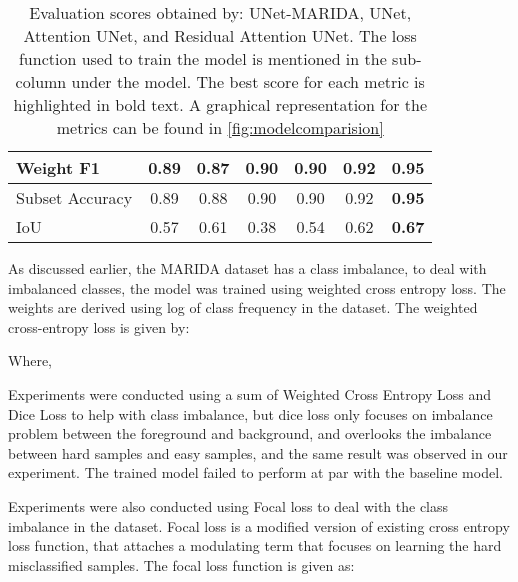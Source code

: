 \documentclass[review]{elsarticle}
\begin{document}
\begin{table}[]
{\begin{tabular}{|l|c|ccc|c|c|}
Weight F1 & 0.89 & \multicolumn{1}{c|}{0.87} & \multicolumn{1}{c|}{0.90} & 0.90 & 0.92 & \textbf{0.95} \\ \hline
Subset Accuracy & 0.89 & \multicolumn{1}{c|}{0.88} & \multicolumn{1}{c|}{0.90} & 0.90 & 0.92 & \textbf{0.95} \\ \hline
IoU & 0.57 & \multicolumn{1}{c|}{0.61} & \multicolumn{1}{c|}{0.38} & 0.54 & 0.62 & \textbf{0.67} \\ \hline
\end{tabular}}
\caption{Evaluation scores obtained by: UNet-MARIDA, UNet, Attention UNet, and Residual Attention UNet. The loss function used to train the model is mentioned in the sub-column under the model. The best score for each metric is highlighted in bold text. A graphical representation for the metrics can be found in \autoref{fig:modelcomparision}}
\label{tab:evaluation-table}
\end{table}

As discussed earlier, the MARIDA dataset has a class imbalance, to deal with imbalanced classes, the model was trained using weighted cross entropy loss. The weights are derived using log of class frequency in the dataset. The weighted cross-entropy loss is given by:

Where, 

Experiments were conducted using a sum of Weighted Cross Entropy Loss and Dice Loss to help with class imbalance, but dice loss only focuses on imbalance problem between the foreground and background, and overlooks the imbalance between hard samples and easy samples\cite{9338261}, and the same result was observed in our experiment. The trained model failed to perform at par with the baseline model.

Experiments were also conducted using Focal loss\cite{8417976} to deal with the class imbalance in the dataset. Focal loss is a modified version of existing cross entropy loss function, that attaches a modulating term that focuses on learning the hard misclassified samples. The focal loss function is given as:
\end{document}
